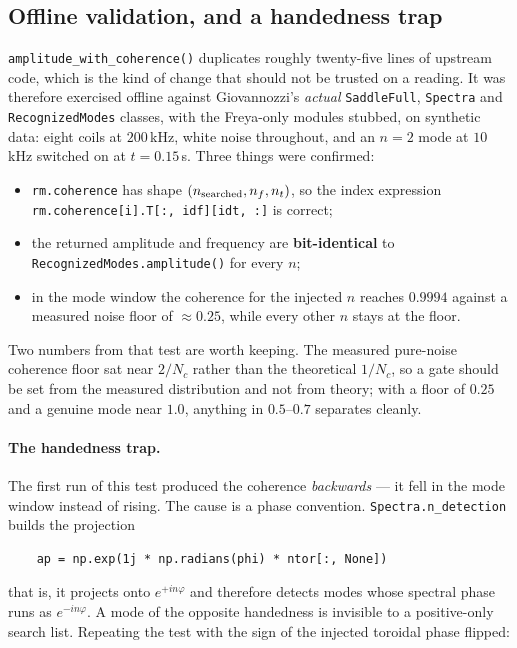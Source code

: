 \documentclass[11pt,a4paper]{article}
\newcommand{\code}[1]{\texttt{\small #1}}
\begin{document}
\subsection{Offline validation, and a handedness trap}
\label{sec:handed}

\code{amplitude\_with\_coherence()} duplicates roughly twenty-five lines of upstream code,
which is the kind of change that should not be trusted on a reading. It was therefore
exercised offline against Giovannozzi's \emph{actual} \code{SaddleFull}, \code{Spectra} and
\code{RecognizedModes} classes, with the Freya-only modules stubbed, on synthetic data:
eight coils at $200$\,kHz, white noise throughout, and an $n=2$ mode at $10$\,kHz switched
on at $t = 0.15$\,s. Three things were confirmed:

\begin{itemize}[leftmargin=2em,noitemsep]
\item \code{rm.coherence} has shape $(n_{\rm searched}, n_f, n_t)$, so the index expression
\code{rm.coherence[i].T[:, idf][idt, :]} is correct;
\item the returned amplitude and frequency are \textbf{bit-identical} to
\code{RecognizedModes.amplitude()} for every $n$;
\item in the mode window the coherence for the injected $n$ reaches $0.9994$ against a
measured noise floor of $\approx 0.25$, while every other $n$ stays at the floor.
\end{itemize}

\noindent
Two numbers from that test are worth keeping. The measured pure-noise coherence floor sat
near $2/N_c$ rather than the theoretical $1/N_c$, so a gate should be set from the measured
distribution and not from theory; with a floor of $0.25$ and a genuine mode near $1.0$,
anything in $0.5$--$0.7$ separates cleanly.

\paragraph{The handedness trap.} The first run of this test produced the coherence
\emph{backwards} --- it fell in the mode window instead of rising. The cause is a phase
convention. \code{Spectra.n\_detection} builds the projection
\begin{verbatim}
    ap = np.exp(1j * np.radians(phi) * ntor[:, None])
\end{verbatim}
that is, it projects onto $e^{+i n \varphi}$ and therefore detects modes whose spectral
phase runs as $e^{-i n \varphi}$. A mode of the opposite handedness is invisible to a
positive-only search list. Repeating the test with the sign of the injected toroidal phase
flipped:
\end{document}
